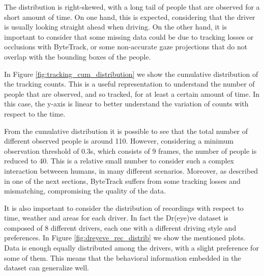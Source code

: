 The distribution is right-skewed, with a long tail of people that are observed 
for a short amount of time.
On one hand, this is expected, considering that the driver is usually looking 
straight ahead when driving. On the other hand, it is important to consider 
that some missing data could be due to tracking losses or occlusions with 
ByteTrack, or some non-accurate gaze projections that do not overlap with the 
bounding boxes of the people.

In Figure \ref{fig:tracking_cum_distribution} we show the cumulative distribution 
of the tracking counts. This is a useful representation to understand the number 
of people that are observed, and so tracked, for at least a certain amount of time. 
In this case, the y-axis is linear to better understand the variation of counts 
with respect to the time.

From the cumulative distribution it is possible to see that the total number of 
different observed people is around 110. However, considering a minimum observation 
threshold of 0.3s, which consists of 9 frames, the number of people is reduced 
to 40.
This is a relative small number to consider such a complex interaction betweeen 
humans, in many different scenarios. Moreover, as described in one of the next 
sections, ByteTrack suffers from some tracking losses and mismatching, 
compromising the quality of the data.

It is also important to consider the distribution of recordings with respect to 
time, weather and areas for each driver. In fact the Dr(eye)ve dataset is 
composed of 8 different drivers, each one with a different driving style and 
preferences. In Figure \ref{fig:dreyeve_rec_distrib} we 
show the mentioned plots. Data is enough equally distributed among the drivers, 
with a slight preference for some of them. This means that the behavioral 
information embedded in the dataset can generalize well.

